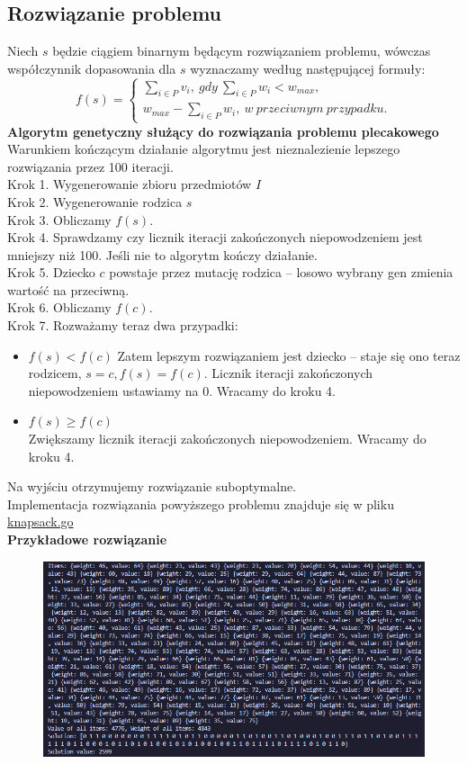 \documentclass{article}
\begin{document}
	\subsection{Rozwiązanie problemu}
	Niech $s$ będzie ciągiem binarnym będącym rozwiązaniem problemu, wówczas
	współczynnik dopasowania dla $s$ wyznaczamy według następującej formuły:
	\[
		f(s) = \left\{
		\begin{array}{l}
			\sum_{i\in P}v_i,\ gdy\ \sum_{i\in P}w_i < w_{max},    \\
			w_{max} - \sum_{i\in P}w_i,\ w\ przeciwnym\ przypadku.
		\end{array}\right.
	\]
	\textbf{Algorytm genetyczny służący do rozwiązania problemu plecakowego}\\ Warunkiem
	kończącym działanie algorytmu jest nieznalezienie lepszego rozwiązania przez 100
	iteracji.\\ Krok 1. Wygenerowanie zbioru przedmiotów $I$\\ Krok 2.
	Wygenerowanie rodzica $s$\\ Krok 3. Obliczamy $f(s)$.\\ Krok 4. Sprawdzamy czy
	licznik iteracji zakończonych niepowodzeniem jest mniejszy niż 100. Jeśli nie to
	algorytm kończy działanie.\\ Krok 5. Dziecko $c$ powstaje przez mutację rodzica
	-- losowo wybrany gen zmienia wartość na przeciwną.\\ Krok 6. Obliczamy $f(c)$.\\
	Krok 7. Rozważamy teraz dwa przypadki:
	\begin{itemize}
		\item $f(s)<f(c)$ Zatem lepszym rozwiązaniem jest dziecko -- staje się ono
			teraz rodzicem, $s=c, f(s)=f(c)$. Licznik iteracji zakończonych
			niepowodzeniem ustawiamy na 0. Wracamy do kroku 4.

		\item $f(s)\geq f(c)$\\ Zwiększamy licznik iteracji zakończonych
			niepowodzeniem. Wracamy do kroku 4.
	\end{itemize}
	Na wyjściu otrzymujemy rozwiązanie suboptymalne.\\ Implementacja rozwiązania powyższego
	problemu znajduje się w pliku \href{https://github.com/Kaniek99/AIbasics/blob/main/src/knapsack/knapsack.go}{knapsack.go}\\
	\textbf{Przykładowe rozwiązanie}\\
	\begin{figure}[h]
		\includegraphics[width=\linewidth]{knapsack_example.png}
	\end{figure}
	\newpage
\end{document}
